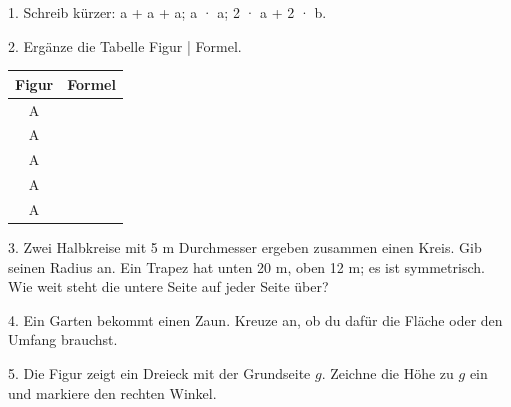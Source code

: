 \documentclass[11pt]{article}
\begin{document}
\pfheftstil
{}
\pfrueckblick
\begin{pfaufg}{}{1.}{}
Schreib kürzer: a + a + a; a · a; 2 · a + 2 · b.
\end{pfaufg}
\begin{pfaufg}{}{2.}{}
Ergänze die Tabelle Figur | Formel.
\par\smallskip\noindent \begingroup\renewcommand{\arraystretch}{1.3}\begin{tabular}{|c|c|}\hline \textbf{Figur} & \textbf{Formel} \\ \hline A & \rule{0pt}{3ex}\hspace{1.6cm} \\ \hline A & \rule{0pt}{3ex}\hspace{1.6cm} \\ \hline A & \rule{0pt}{3ex}\hspace{1.6cm} \\ \hline A & \rule{0pt}{3ex}\hspace{1.6cm} \\ \hline A & \rule{0pt}{3ex}\hspace{1.6cm} \\ \hline\end{tabular}\endgroup\par
{}
\end{pfaufg}
\begin{pfaufg}{}{3.}{}
Zwei Halbkreise mit 5 m Durchmesser ergeben zusammen einen Kreis. Gib seinen Radius an. Ein Trapez hat unten 20 m, oben 12 m; es ist symmetrisch. Wie weit steht die untere Seite auf jeder Seite über?
\end{pfaufg}
\pfgruppe{}
\begin{pfaufg}{}{4.}{}
Ein Garten bekommt einen Zaun. Kreuze an, ob du dafür die Fläche oder den Umfang brauchst. 
\end{pfaufg}
\begin{pfaufg}{}{5.}{}
Die Figur zeigt ein Dreieck mit der Grundseite $g$. Zeichne die Höhe zu $g$ ein und markiere den rechten Winkel.
\par\smallskip\noindent {}\par
{}
\end{pfaufg}
\end{document}
